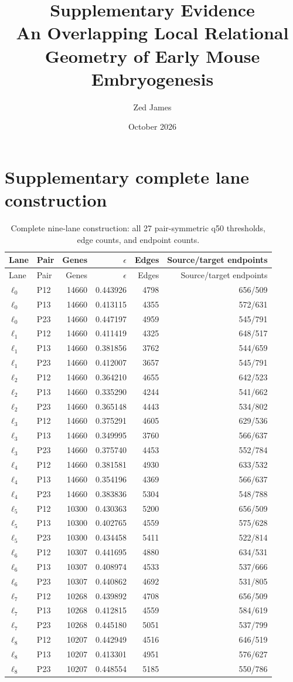 \documentclass[11pt]{article}
\title{Supplementary Evidence\\[0.3em]\large An Overlapping Local Relational Geometry of Early Mouse Embryogenesis}
\author{Zed James}
\date{October 2026}
\begin{document}
\maketitle
\appendix

\section{Supplementary complete lane construction}

\begin{longtable}{@{}llrrrr@{}}
\caption{Complete nine-lane construction: all 27 pair-symmetric q50 thresholds, edge counts, and endpoint counts.}
\label{tab:supp_laneauthority}\\
\toprule
Lane & Pair & Genes & \(\epsilon\) & Edges & Source/target endpoints\\
\midrule
\endfirsthead
\toprule
Lane & Pair & Genes & \(\epsilon\) & Edges & Source/target endpoints\\
\midrule
\endhead
$\ell_0$&P12&14660&0.443926&4798&656/509\\
$\ell_0$&P13&14660&0.413115&4355&572/631\\
$\ell_0$&P23&14660&0.447197&4959&545/791\\
$\ell_1$&P12&14660&0.411419&4325&648/517\\
$\ell_1$&P13&14660&0.381856&3762&544/659\\
$\ell_1$&P23&14660&0.412007&3657&545/791\\
$\ell_2$&P12&14660&0.364210&4655&642/523\\
$\ell_2$&P13&14660&0.335290&4244&541/662\\
$\ell_2$&P23&14660&0.365148&4443&534/802\\
$\ell_3$&P12&14660&0.375291&4605&629/536\\
$\ell_3$&P13&14660&0.349995&3760&566/637\\
$\ell_3$&P23&14660&0.375740&4453&552/784\\
$\ell_4$&P12&14660&0.381581&4930&633/532\\
$\ell_4$&P13&14660&0.354196&4369&566/637\\
$\ell_4$&P23&14660&0.383836&5304&548/788\\
$\ell_5$&P12&10300&0.430363&5200&656/509\\
$\ell_5$&P13&10300&0.402765&4559&575/628\\
$\ell_5$&P23&10300&0.434458&5411&522/814\\
$\ell_6$&P12&10307&0.441695&4880&634/531\\
$\ell_6$&P13&10307&0.408974&4533&537/666\\
$\ell_6$&P23&10307&0.440862&4692&531/805\\
$\ell_7$&P12&10268&0.439892&4708&656/509\\
$\ell_7$&P13&10268&0.412815&4559&584/619\\
$\ell_7$&P23&10268&0.445180&5051&537/799\\
$\ell_8$&P12&10207&0.442949&4516&646/519\\
$\ell_8$&P13&10207&0.413301&4951&576/627\\
$\ell_8$&P23&10207&0.448554&5185&550/786\\
\bottomrule
\end{longtable}
\end{document}
